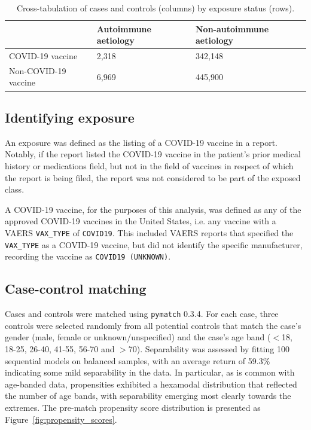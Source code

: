 \documentclass{article}
\begin{document}
\begin{table}[H]
\centering
\begin{tabular}{@{}lll@{}}
\toprule
                     & Autoimmune aetiology & Non-autoimmune aetiology \\ \midrule
COVID-19 vaccine     & 2,318                & 342,148                  \\
Non-COVID-19 vaccine & 6,969                & 445,900                  \\ \bottomrule
\end{tabular}
\caption{Cross-tabulation of cases and controls (columns) by exposure status (rows).}
\label{tab:categories_crosstab}
\end{table}


\subsection{Identifying exposure}

An exposure was defined as the listing of a COVID-19 vaccine in a report.
Notably, if the report listed the COVID-19 vaccine in the patient's prior medical history or medications field, but not in the field of vaccines in respect of which the report is being filed, the report was not considered to be part of the exposed class.

A COVID-19 vaccine, for the purposes of this analysis, was defined as any of the approved COVID-19 vaccines in the United States, i.e. any vaccine with a VAERS \texttt{VAX\_TYPE} of \texttt{COVID19}.
This included VAERS reports that specified the \texttt{VAX\_TYPE} as a COVID-19 vaccine, but did not identify the specific manufacturer, recording the vaccine as \texttt{COVID19 (UNKNOWN)}.

\subsection{Case-control matching}

Cases and controls were matched using \texttt{pymatch} 0.3.4.
For each case, three controls were selected randomly from all potential controls that match the case's gender (male, female or unknown/unspecified) and the case's age band ($<$18, 18-25, 26-40, 41-55, 56-70 and $>$70).
Separability was assessed by fitting 100 sequential models on balanced samples, with an average return of 59.3\% indicating some mild separability in the data.
In particular, as is common with age-banded data, propensities exhibited a hexamodal distribution that reflected the number of age bands, with separability emerging most clearly towards the extremes.
The pre-match propensity score distribution is presented as Figure~\ref{fig:propensity_scores}.
\end{document}
